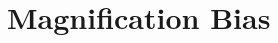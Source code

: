 \documentclass[a4paper,usenatbib]{mnras}
\begin{document}
%
%

\section{Magnification Bias}\label{sec:magbias}
%
\end{document}
